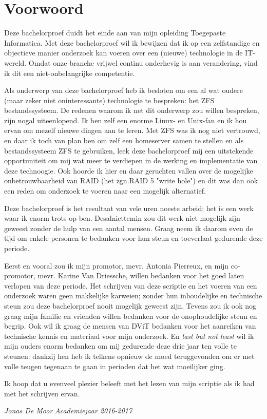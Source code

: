 
\chapter*{Voorwoord}
\label{ch:voorwoord}


Deze bachelorproef duidt het einde aan van mijn opleiding Toegepaste Informatica. Met deze bachelorproef wil ik bewijzen dat ik op een zelfstandige en objectieve manier onderzoek kan voeren over een (nieuwe) technologie in de IT-wereld. Omdat onze branche vrijwel continu onderhevig is aan verandering, vind ik dit een niet-onbelangrijke competentie. 

Als onderwerp van deze bachelorproef heb ik besloten om een al wat oudere (maar zeker niet oninteressante) technologie te bespreken: het ZFS bestandssysteem. De redenen waarom ik net dit onderwerp zou willen bespreken, zijn nogal uiteenlopend. Ik ben zelf een enorme Linux- en Unix-fan en ik hou ervan om mezelf nieuwe dingen aan te leren. Met ZFS was ik nog niet vertrouwd, en daar ik toch van plan ben om zelf een homeserver samen te stellen en als bestandssysteem ZFS te gebruiken, leek deze bachelorproef mij een uitstekende opportuniteit om mij wat meer te verdiepen in de werking en implementatie van deze technoogie. Ook hoorde ik hier en daar geruchten vallen over de mogelijke onbetrouwbaarheid van RAID (het zgn.RAID 5 "write hole") en dit was dan ook een reden om onderzoek te voeren naar een mogelijk alternatief.

Deze bachelorproef is het resultaat van vele uren noeste arbeid; het is een werk waar ik enorm trots op ben. Desalniettemin zou dit werk niet mogelijk zijn geweest zonder de hulp van een aantal mensen. Graag neem ik daarom even de tijd om enkele personen te bedanken voor hun steun en toeverlaat gedurende deze periode. 

Eerst en vooral zou ik mijn promotor, mevr. Antonia Pierreux, en mijn co-promotor, mevr. Karine Van Driessche, willen bedanken voor het goed laten verlopen van deze periode. Het schrijven van deze scriptie en het voeren van een onderzoek waren geen makkelijke karweien; zonder hun inhoudelijke en technische steun zou deze bachelorproef nooit mogelijk geweest zijn. Tevens zou ik ook nog graag mijn familie en vrienden willen bedanken voor de onophoudelijke steun en begrip. Ook wil ik graag de mensen van DViT bedanken voor het aanreiken van technische kennis en materiaal voor mijn onderzoek. En \textit{last but not least} wil ik mijn ouders enorm bedanken om mij gedurende deze drie jaar ten volle te steunen: dankzij hen heb ik telkens opnieuw de moed teruggevonden om er met volle teugen tegenaan te gaan in perioden dat het wat moeilijker ging.

Ik hoop dat u evenveel plezier beleeft met het lezen van mijn scriptie als ik had met het schrijven ervan.

\begin{flushright}
  \textit{Jonas De Moor}
  \textit{Academiejaar 2016-2017}
\end{flushright}
